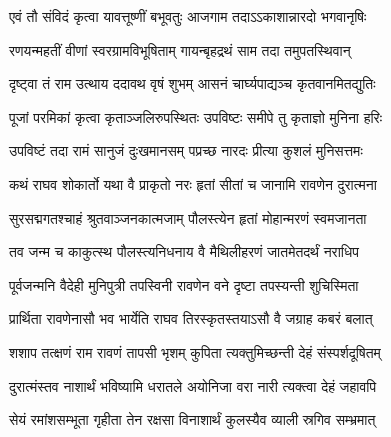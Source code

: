 
\translink{}

\storymeta


\twolineshloka
{एवं तौ संविदं कृत्वा यावत्तूष्णीं बभूवतुः}
{आजगाम तदाऽऽकाशान्नारदो भगवानृषिः}%

\twolineshloka
{रणयन्महतीं वीणां स्वरग्रामविभूषिताम्}
{गायन्बृहद्रथं साम तदा तमुपतस्थिवान्}%

\twolineshloka
{दृष्ट्वा तं राम उत्थाय ददावथ वृषं शुभम्}
{आसनं चार्घ्यपाद्यञ्च कृतवानमितद्युतिः}%

\twolineshloka
{पूजां परमिकां कृत्वा कृताञ्जलिरुपस्थितः}
{उपविष्टः समीपे तु कृताज्ञो मुनिना हरिः}%

\twolineshloka
{उपविष्टं तदा रामं सानुजं दुःखमानसम्}
{पप्रच्छ नारदः प्रीत्या कुशलं मुनिसत्तमः}%

\twolineshloka
{कथं राघव शोकार्तो यथा वै प्राकृतो नरः}
{हृतां सीतां च जानामि रावणेन दुरात्मना}%

\twolineshloka
{सुरसद्मगतश्चाहं श्रुतवाञ्जनकात्मजाम्}
{पौलस्त्येन हृतां मोहान्मरणं स्वमजानता}%

\twolineshloka
{तव जन्म च काकुत्स्थ पौलस्त्यनिधनाय वै}
{मैथिलीहरणं जातमेतदर्थं नराधिप}%

\twolineshloka
{पूर्वजन्मनि वैदेही मुनिपुत्री तपस्विनी}
{रावणेन वने दृष्टा तपस्यन्ती शुचिस्मिता}%

\twolineshloka
{प्रार्थिता रावणेनासौ भव भार्येति राघव}
{तिरस्कृतस्तयाऽसौ वै जग्राह कबरं बलात्}%

\twolineshloka
{शशाप तत्क्षणं राम रावणं तापसी भृशम्}
{कुपिता त्यक्तुमिच्छन्ती देहं संस्पर्शदूषितम्}%

\twolineshloka
{दुरात्मंस्तव नाशार्थं भविष्यामि धरातले}
{अयोनिजा वरा नारी त्यक्त्वा देहं जहावपि}%

\twolineshloka
{सेयं रमांशसम्भूता गृहीता तेन रक्षसा}
{विनाशार्थं कुलस्यैव व्याली स्रगिव सम्भ्रमात्}%

